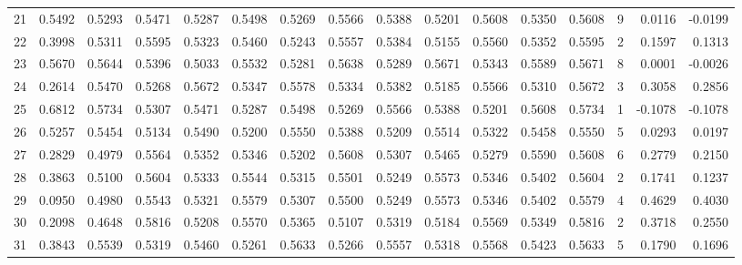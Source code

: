 \begin{tabular}{lrrrrrrrrrrrrrrr}
21  &      0.5492 &  0.5293 &  0.5471 &  0.5287 &  0.5498 &  0.5269 &  0.5566 &  0.5388 &  0.5201 &  0.5608 &   0.5350 &     0.5608 &      9 &                    0.0116 &                    -0.0199 \\
22  &      0.3998 &  0.5311 &  0.5595 &  0.5323 &  0.5460 &  0.5243 &  0.5557 &  0.5384 &  0.5155 &  0.5560 &   0.5352 &     0.5595 &      2 &                    0.1597 &                     0.1313 \\
23  &      0.5670 &  0.5644 &  0.5396 &  0.5033 &  0.5532 &  0.5281 &  0.5638 &  0.5289 &  0.5671 &  0.5343 &   0.5589 &     0.5671 &      8 &                    0.0001 &                    -0.0026 \\
24  &      0.2614 &  0.5470 &  0.5268 &  0.5672 &  0.5347 &  0.5578 &  0.5334 &  0.5382 &  0.5185 &  0.5566 &   0.5310 &     0.5672 &      3 &                    0.3058 &                     0.2856 \\
25  &      0.6812 &  0.5734 &  0.5307 &  0.5471 &  0.5287 &  0.5498 &  0.5269 &  0.5566 &  0.5388 &  0.5201 &   0.5608 &     0.5734 &      1 &                   -0.1078 &                    -0.1078 \\
26  &      0.5257 &  0.5454 &  0.5134 &  0.5490 &  0.5200 &  0.5550 &  0.5388 &  0.5209 &  0.5514 &  0.5322 &   0.5458 &     0.5550 &      5 &                    0.0293 &                     0.0197 \\
27  &      0.2829 &  0.4979 &  0.5564 &  0.5352 &  0.5346 &  0.5202 &  0.5608 &  0.5307 &  0.5465 &  0.5279 &   0.5590 &     0.5608 &      6 &                    0.2779 &                     0.2150 \\
28  &      0.3863 &  0.5100 &  0.5604 &  0.5333 &  0.5544 &  0.5315 &  0.5501 &  0.5249 &  0.5573 &  0.5346 &   0.5402 &     0.5604 &      2 &                    0.1741 &                     0.1237 \\
29  &      0.0950 &  0.4980 &  0.5543 &  0.5321 &  0.5579 &  0.5307 &  0.5500 &  0.5249 &  0.5573 &  0.5346 &   0.5402 &     0.5579 &      4 &                    0.4629 &                     0.4030 \\
30  &      0.2098 &  0.4648 &  0.5816 &  0.5208 &  0.5570 &  0.5365 &  0.5107 &  0.5319 &  0.5184 &  0.5569 &   0.5349 &     0.5816 &      2 &                    0.3718 &                     0.2550 \\
31  &      0.3843 &  0.5539 &  0.5319 &  0.5460 &  0.5261 &  0.5633 &  0.5266 &  0.5557 &  0.5318 &  0.5568 &   0.5423 &     0.5633 &      5 &                    0.1790 &                     0.1696 \\

\end{tabular}
